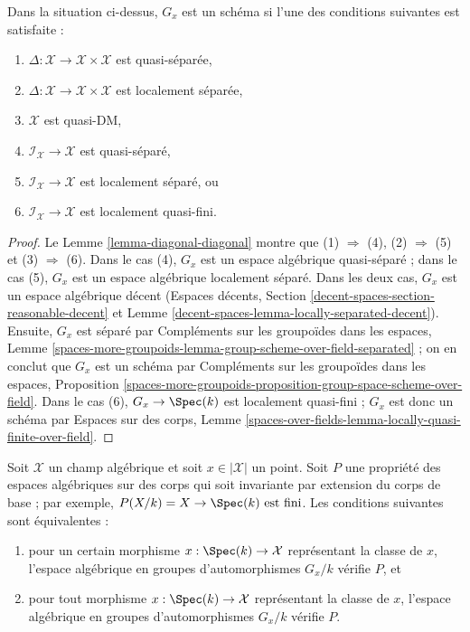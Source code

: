 \begin{lemma}
\label{lemma-automorphism-group-scheme}
Dans la situation ci-dessus, $G_x$ est un schéma si l'une des conditions
suivantes est satisfaite :
\begin{enumerate}
\item $\Delta : \mathcal{X} \to \mathcal{X} \times \mathcal{X}$
est quasi-séparée,
\item $\Delta : \mathcal{X} \to \mathcal{X} \times \mathcal{X}$
est localement séparée,
\item $\mathcal{X}$ est quasi-DM,
\item $\mathcal{I}_\mathcal{X} \to \mathcal{X}$
est quasi-séparé,
\item $\mathcal{I}_\mathcal{X} \to \mathcal{X}$
est localement séparé, ou
\item $\mathcal{I}_\mathcal{X} \to \mathcal{X}$
est localement quasi-fini.
\end{enumerate}
\end{lemma}

\begin{proof}
Le Lemme \ref{lemma-diagonal-diagonal} montre que
(1) $\Rightarrow$ (4), (2) $\Rightarrow$ (5) et (3) $\Rightarrow$ (6).
Dans le cas (4), $G_x$ est un espace algébrique quasi-séparé ; dans le cas
(5), $G_x$ est un espace algébrique localement séparé.
Dans les deux cas, $G_x$ est un espace algébrique décent
(Espaces décents,
Section \ref{decent-spaces-section-reasonable-decent} et
Lemme \ref{decent-spaces-lemma-locally-separated-decent}).
Ensuite, $G_x$ est séparé par Compléments sur les groupoïdes dans les espaces,
Lemme \ref{spaces-more-groupoids-lemma-group-scheme-over-field-separated} ;
on en conclut que $G_x$ est un schéma par Compléments sur les groupoïdes dans
les espaces, Proposition
\ref{spaces-more-groupoids-proposition-group-space-scheme-over-field}.
Dans le cas (6), $G_x \to \Spec(k)$ est localement quasi-fini ; $G_x$ est donc
un schéma par Espaces sur des corps,
Lemme \ref{spaces-over-fields-lemma-locally-quasi-finite-over-field}.
\end{proof}

\begin{lemma}
\label{lemma-property-automorphism-groups}
Soit $\mathcal{X}$ un champ algébrique et soit $x \in |\mathcal{X}|$ un point.
Soit $P$ une propriété des espaces algébriques sur des corps qui soit
invariante par extension du corps de base ; par exemple,
$P(X/k) = X \to \Spec(k)\text{ est fini}$.
Les conditions suivantes sont équivalentes :
\begin{enumerate}
\item pour un certain morphisme $x : \Spec(k) \to \mathcal{X}$ représentant
la classe de $x$, l'espace algébrique en groupes d'automorphismes $G_x/k$
vérifie $P$, et
\item pour tout morphisme $x : \Spec(k) \to \mathcal{X}$ représentant
la classe de $x$, l'espace algébrique en groupes d'automorphismes $G_x/k$
vérifie $P$.
\end{enumerate}
\end{lemma}

